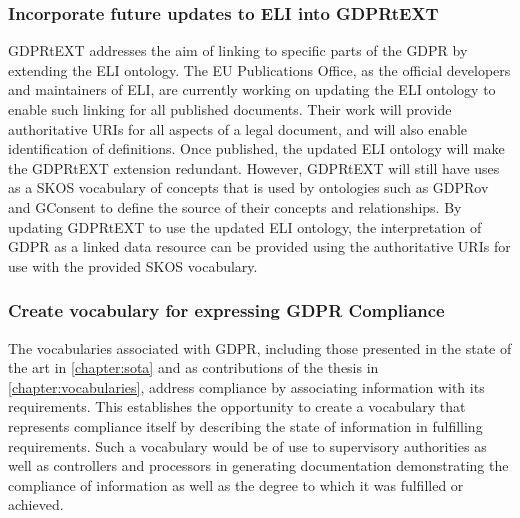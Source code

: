 \subsubsection*{Incorporate future updates to ELI into GDPRtEXT}
GDPRtEXT addresses the aim of linking to specific parts of the GDPR by extending the ELI ontology. The EU Publications Office, as the official developers and maintainers of ELI, are currently working on updating the ELI ontology to enable such linking for all published documents. Their work will provide authoritative URIs for all aspects of a legal document, and will also enable identification of definitions. Once published, the updated ELI ontology will make the GDPRtEXT extension redundant. However, GDPRtEXT will still have uses as a SKOS vocabulary of concepts that is used by ontologies such as GDPRov and GConsent to define the source of their concepts and relationships. By updating GDPRtEXT to use the updated ELI ontology, the interpretation of GDPR as a linked data resource can be provided using the authoritative URIs for use with the provided SKOS vocabulary.

\subsubsection*{Create vocabulary for expressing GDPR Compliance}
The vocabularies associated with GDPR, including those presented in the state of the art in \autoref{chapter:sota} and as contributions of the thesis in \autoref{chapter:vocabularies}, address compliance by associating information with its requirements. This establishes the opportunity to create a vocabulary that represents compliance itself by describing the state of information in fulfilling requirements. Such a vocabulary would be of use to supervisory authorities as well as controllers and processors in generating documentation demonstrating the compliance of information as well as the degree to which it was fulfilled or achieved.


